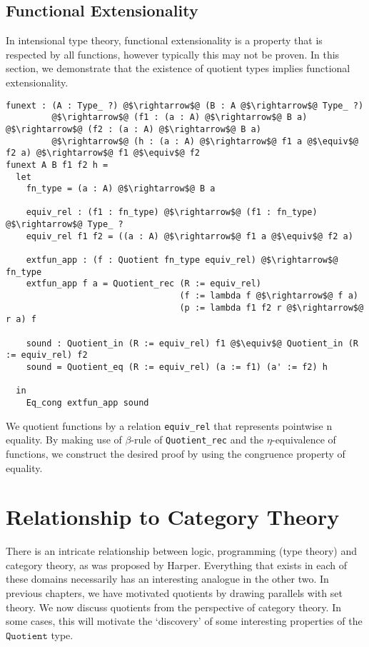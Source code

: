 \documentclass[12pt,twoside,maitrise]{dms}
\theoremstyle{definition}
\numberwithin{equation}{section}
\numberwithin{table}{chapter}
\numberwithin{figure}{chapter}
\newcommand\id[1] {\texttt{#1}}
\begin{document}
\section{Functional Extensionality}\label{sec:quot-implies-funext}

In intensional type theory, functional extensionality is a property that is
respected by all functions, however typically this may not be proven. In this
section, we demonstrate that the existence of quotient types implies functional
extensionality.

\begin{verbatim}
funext : (A : Type_ ?) @$\rightarrow$@ (B : A @$\rightarrow$@ Type_ ?)
         @$\rightarrow$@ (f1 : (a : A) @$\rightarrow$@ B a) @$\rightarrow$@ (f2 : (a : A) @$\rightarrow$@ B a)
         @$\rightarrow$@ (h : (a : A) @$\rightarrow$@ f1 a @$\equiv$@ f2 a) @$\rightarrow$@ f1 @$\equiv$@ f2
funext A B f1 f2 h =
  let
    fn_type = (a : A) @$\rightarrow$@ B a

    equiv_rel : (f1 : fn_type) @$\rightarrow$@ (f1 : fn_type) @$\rightarrow$@ Type_ ?
    equiv_rel f1 f2 = ((a : A) @$\rightarrow$@ f1 a @$\equiv$@ f2 a)

    extfun_app : (f : Quotient fn_type equiv_rel) @$\rightarrow$@ fn_type
    extfun_app f a = Quotient_rec (R := equiv_rel)
                                  (f := lambda f @$\rightarrow$@ f a)
                                  (p := lambda f1 f2 r @$\rightarrow$@ r a) f

    sound : Quotient_in (R := equiv_rel) f1 @$\equiv$@ Quotient_in (R := equiv_rel) f2
    sound = Quotient_eq (R := equiv_rel) (a := f1) (a' := f2) h

  in
    Eq_cong extfun_app sound
\end{verbatim}

We quotient functions by a relation \id{equiv\_rel} that represents pointwise
n
equality. By making use of $\beta$-rule of \id{Quotient\_rec} and the
$\eta$-equivalence of functions, we construct the desired proof by using the
congruence property of equality.

\chapter{Relationship to Category Theory}
There is an intricate relationship between logic, programming (type theory) and
category theory, as was proposed by Harper\cite{harpertrinity}. Everything that
exists in each of these domains necessarily has an interesting analogue in the
other two. In previous chapters, we have motivated quotients by drawing
parallels with set theory. We now discuss quotients from the perspective of
category theory. In some cases, this will motivate the `discovery' of some
interesting properties of the $\id{Quotient}$ type.
\end{document}
